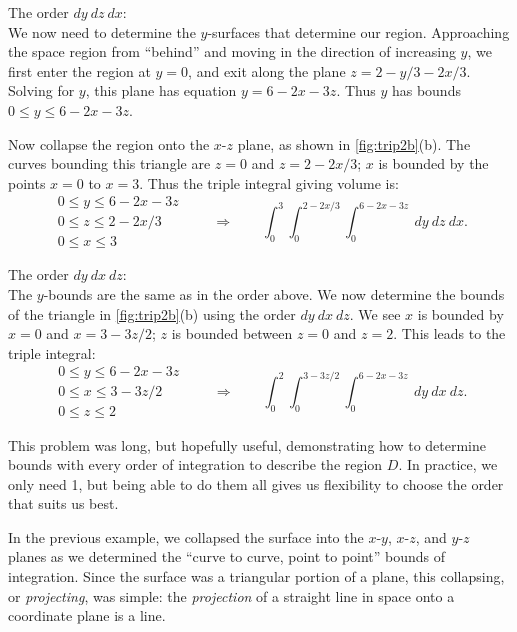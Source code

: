 \begin{example}
\noindent The order $dy\ dz\ dx$:\\

We now need to determine the $y$-surfaces that determine our region. Approaching the space region from ``behind'' and moving in the direction of increasing $y$, we first enter the region at $y=0$, and exit along the plane $z= 2-y/3-2x/3$. Solving for $y$, this plane has equation $y = 6-2x-3z$. Thus $y$ has bounds $0\leq y\leq 6-2x-3z$. 

Now collapse the region onto the $x$-$z$ plane, as shown in \autoref{fig:trip2b}(b). The curves bounding this triangle are $z=0$ and $z=2-2x/3$; $x$ is bounded by the points $x=0$ to $x=3$. Thus the triple integral giving volume is: 
\[
 \begin{gathered}
  0\leq y\leq 6-2x-3z\\
  0\leq z\leq 2-2x/3\\
  0\leq x\leq 3
 \end{gathered}
 \qquad\Rightarrow\qquad
 \int_0^3\int_0^{2-2x/3}\int_0^{6-2x-3z}\ dy\ dz\ dx.
\]

\noindent The order $dy\ dx\ dz$:\\

The $y$-bounds are the same as in the order above. We now determine the bounds of the triangle in \autoref{fig:trip2b}(b) using the order $dy\ dx\ dz$. We see $x$ is bounded by $x=0$ and $x=3-3z/2$; $z$ is bounded between $z=0$ and $z=2$. This leads to the triple integral:
\[
 \begin{gathered}
  0\leq y\leq 6-2x-3z\\
  0\leq x\leq 3-3z/2\\
  0\leq z\leq 2
 \end{gathered}
 \qquad\Rightarrow\qquad
 \int_0^2\int_0^{3-3z/2}\int_0^{6-2x-3z}\ dy\ dx\ dz.
\]

This problem was long, but hopefully useful, demonstrating how to determine bounds with every order of integration to describe the region $D$. In practice, we only need 1, but being able to do them all gives us flexibility to choose the order that suits us best.
\end{example}

In the previous example, we collapsed the surface into the $x$-$y$, $x$-$z$, and $y$-$z$ planes as we determined the ``curve to curve, point to point'' bounds of integration. Since the surface was a triangular portion of a plane, this collapsing, or \textit{projecting}, was simple: the \textit{projection} of a straight line in space onto a coordinate plane is a line.

